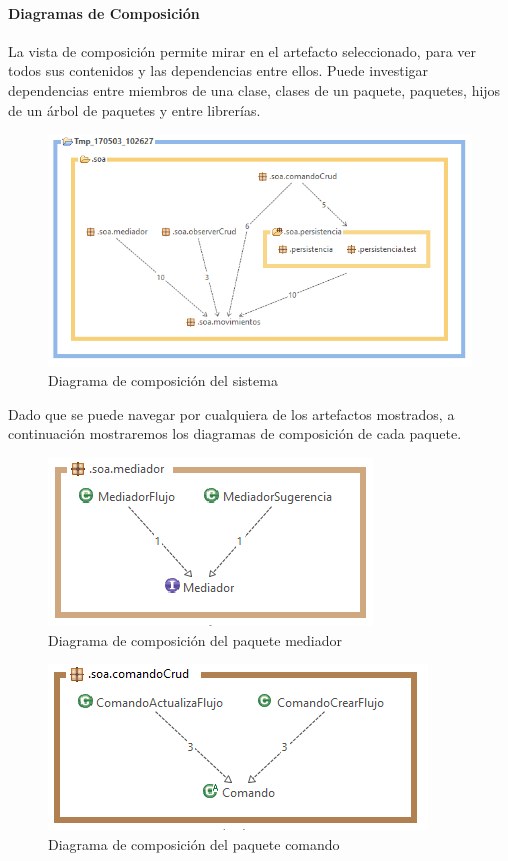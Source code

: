 \paragraph{Diagramas de Composición}

La vista de composición permite mirar en el artefacto seleccionado, para ver todos sus contenidos y las dependencias entre ellos. Puede investigar dependencias entre miembros de una clase, clases de un paquete, paquetes, hijos de un árbol de paquetes y entre librerías\cite{Pw9Cmp}.

\begin{figure}[H]
	\centering
	\includegraphics[width=1\linewidth]{parte2/imgs/Metricas/diagramaComposicion}
	\caption{Diagrama de composición del sistema}
	\label{fig:composicion}
\end{figure}

Dado que se puede navegar por cualquiera de los artefactos mostrados, a  continuación mostraremos los diagramas de composición de cada paquete.

\begin{figure}[H]
	\centering
	\includegraphics[width=0.7\linewidth]{parte2/imgs/Metricas/SoaMediador}
	\caption{Diagrama de composición del paquete mediador}
	\label{fig:soamediador}
\end{figure}

\begin{figure}[H]
	\centering
	\includegraphics[width=0.7\linewidth]{parte2/imgs/Metricas/SoaComandoCrud}
	\caption{Diagrama de composición del paquete comando}
	\label{fig:soacomandocrud}
\end{figure}

